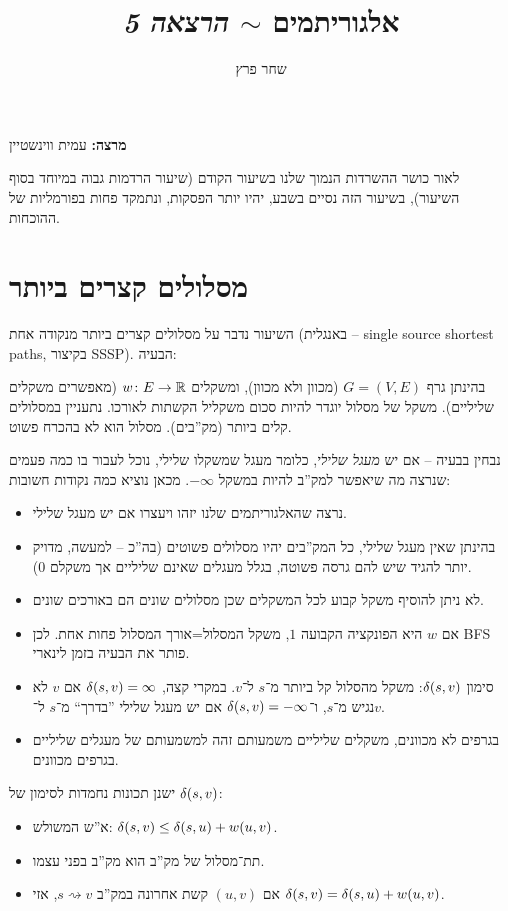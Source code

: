 \documentclass[]{../../../../tex/classes/styledArticle}
\author{שחר פרץ}
\title{אלגוריתמים $\sim$ \textit{הרצאה 5}}
\newcommand\squig{\rightsquigarrow}
\begin{document}
	\maketitle
	\textbf{מרצה: }עמית ווינשטיין
	
	לאור כושר ההשרדות הנמוך שלנו בשיעור הקודם (שיעור הרדמות גבוה במיוחד בסוף השיעור), בשיעור הזה נסיים בשבע, יהיו יותר הפסקות, ונתמקד פחות בפורמליות של ההוכחות. 
	
	\section*{מסלולים קצרים ביותר}
	השיעור נדבר על מסלולים קצרים ביותר מנקודה אחת (באנגלית – single source shortest paths, בקיצור SSSP). הבעיה: 
	
	בהינתן גרף $G = (V, E)$ (מכוון ולא מכוון), ומשקלים $w \colon E \to \mathbb{R}$ (מאפשרים משקלים שליליים). משקל של מסלול יוגדר להיות סכום משקליל הקשתות לאורכו. נתעניין במסלולים קלים ביותר (מק''בים). מסלול הוא לא בהכרח פשוט. 
	
	נבחין בבעיה – אם יש \textit{מעגל שלילי}, כלומר מעגל שמשקלו שלילי, נוכל לעבור בו כמה פעמים שנרצה מה שיאפשר למק''ב להיות במשקל $-\infty$. מכאן נוציא כמה נקודות חשובות: 
	\begin{itemize}
		\item נרצה שהאלגוריתמים שלנו יזהו ויעצרו אם יש מעגל שלילי. 
		\item בהינתן שאין מעגל שלילי, כל המק''בים יהיו מסלולים פשוטים (בה''כ – למעשה, מדויק יותר להגיד שיש להם גרסה פשוטה, בגלל מעגלים שאינם שליליים אך משקלם $0$). 
		\item לא ניתן להוסיף משקל קבוע לכל המשקלים שכן מסלולים שונים הם באורכים שונים. 
		\item אם $w$ היא הפונקציה הקבועה $1$, משקל המסלול=אורך המסלול פחות אחת. לכן BFS פותר את הבעיה בזמן לינארי. 
		\item סימון $\delta(s, v)$: משקל מהסלול קל ביותר מ־$s$ ל־$v$. במקרי קצה, $\delta(s, v) = \infty$ אם $v$ לא נגיש מ־$s$, ו־$\delta(s, v) = -\infty$ אם יש מעגל שלילי ''בדרך`` מ־$s$ ל־$v$. 
		\item בגרפים לא מכוונים, משקלים שליליים משמעותם זהה למשמעותם של מעגלים שליליים בגרפים מכוונים. 
	\end{itemize}
	
	ישנן תכונות נחמדות לסימון של $\delta(s, v)$: 
	\begin{itemize}
		\item א''ש המשולש: $\delta(s, v) \le \delta(s, u) + w(u, v)$. 
		\item תת־מסלול של מק''ב הוא מק''ב בפני עצמו. 
		\item אם $(u, v)$ קשת אחרונה במק''ב $s \squig v$, אזי $\delta(s, v) = \delta(s, u) + w(u, v)$. 
	\end{itemize}
	
\end{document}
